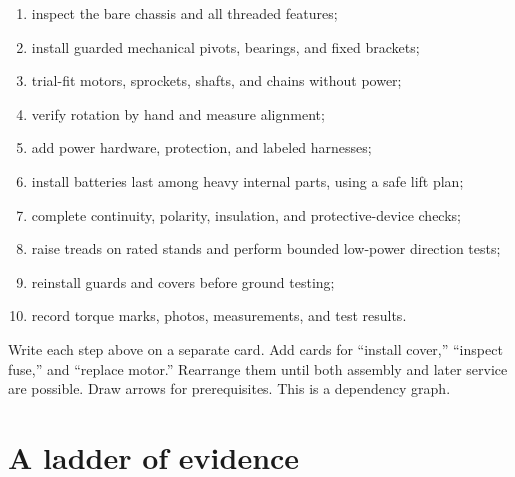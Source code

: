 \documentclass[11pt,openany]{book}
\begin{document}
\begin{enumerate}
  \item inspect the bare chassis and all threaded features;
  \item install guarded mechanical pivots, bearings, and fixed brackets;
  \item trial-fit motors, sprockets, shafts, and chains without power;
  \item verify rotation by hand and measure alignment;
  \item add power hardware, protection, and labeled harnesses;
  \item install batteries last among heavy internal parts, using a safe lift plan;
  \item complete continuity, polarity, insulation, and protective-device checks;
  \item raise treads on rated stands and perform bounded low-power direction tests;
  \item reinstall guards and covers before ground testing;
  \item record torque marks, photos, measurements, and test results.
\end{enumerate}


\begin{buildbox}[title={ASSEMBLY CARD SORT}]
Write each step above on a separate card. Add cards for ``install cover,'' ``inspect fuse,'' and ``replace motor.'' Rearrange them until both assembly and later service are possible. Draw arrows for prerequisites. This is a dependency graph.
\end{buildbox}



\chapter{A ladder of evidence}
\end{document}
